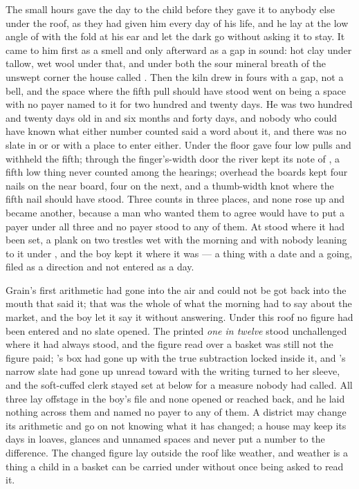 
The small hours gave the day to the child before they gave it to anybody else under the roof, as they had given him every day of his life, and he lay at the low angle of  with the fold at his ear and let the dark go without asking it to stay. It came to him first as a smell and only afterward as a gap in sound: hot clay under tallow, wet wool under that, and under both the sour mineral breath of the unswept corner the house called . Then the kiln drew in fours with a gap, not a bell, and the space where the fifth pull should have stood went on being a space with no payer named to it for two hundred and twenty days. He was two hundred and twenty days old in  and six months and forty days, and nobody who could have known what either number counted said a word about it, and there was no slate in  or  or  with a place to enter either. Under the floor  gave four low pulls and withheld the fifth; through the finger's-width door the river kept its note of , a fifth low thing never counted among the hearings; overhead the boards kept four nails on the near board, four on the next, and a thumb-width knot where the fifth nail should have stood. Three counts in three places, and none rose up and became another, because a man who wanted them to agree would have to put a payer under all three and no payer stood to any of them. At   stood where it had been set, a plank on two trestles wet with the morning and with nobody leaning to it under , and the boy kept it where it was --- a thing with a date and a going, filed as a direction and not entered as a day.

Grain's first arithmetic had gone into the air and could not be got back into the mouth that said it; that was the whole of what the morning had to say about the market, and the boy let it say it without answering. Under this roof no figure had been entered and no slate opened. The printed \emph{one in twelve} stood unchallenged where it had always stood, and the figure read over a basket was still not the figure paid; 's box had gone up  with the true subtraction locked inside it, and 's narrow slate had gone up unread toward  with the writing turned to her sleeve, and the soft-cuffed clerk stayed set at  below  for a measure nobody had called. All three lay offstage in the boy's file and none opened or reached back, and he laid nothing across them and named no payer to any of them. A district may change its arithmetic and go on not knowing what it has changed; a house may keep its days in loaves, glances and unnamed spaces and never put a number to the difference. The changed figure lay outside the roof like weather, and weather is a thing a child in a basket can be carried under without once being asked to read it.


